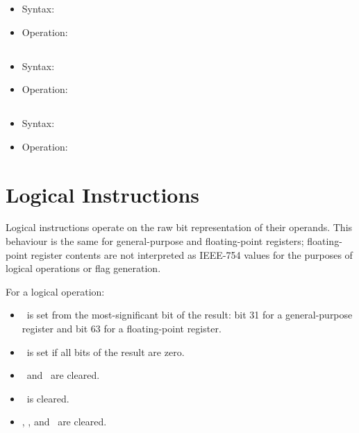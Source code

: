 \begin{itemize}
\item Syntax: 
\item Operation: 
\end{itemize}

\subsection{}

\begin{itemize}
\item Syntax: 
\item Operation: 
\end{itemize}

\subsection{}

\begin{itemize}
\item Syntax: 
\item Operation: 
\end{itemize}

\section{Logical Instructions}

Logical instructions operate on the raw bit representation of their operands.
This behaviour is the same for general-purpose and floating-point registers;
floating-point register contents are not interpreted as IEEE-754 values for
the purposes of logical operations or flag generation.

For a logical operation:

\begin{itemize}
\item \flagN\ is set from the most-significant bit of the result:
bit 31 for a general-purpose register and bit 63 for a floating-point register.
\item \flagZ\ is set if all bits of the result are zero.
\item \flagC\ and \flagV\ are cleared.
\item \flagE\ is cleared.
\item \flagI, \flagU, and \flagX\ are cleared.
\end{itemize}

